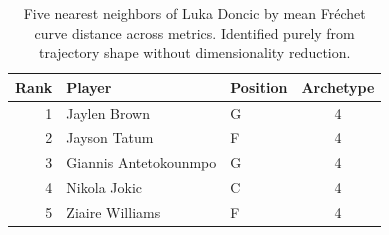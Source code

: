 \begin{table}[htbp]
  \centering\small
  \begin{tabular}{rllc}
    \toprule
    Rank & Player & Position & Archetype \\
    \midrule
    1 & Jaylen Brown & G & 4 \\
    2 & Jayson Tatum & F & 4 \\
    3 & Giannis Antetokounmpo & G & 4 \\
    4 & Nikola Jokic & C & 4 \\
    5 & Ziaire Williams & F & 4 \\
    \bottomrule
  \end{tabular}
  \caption{Five nearest neighbors of Luka Doncic by mean Fr\'{e}chet curve distance across metrics. Identified purely from trajectory shape without dimensionality reduction.}
  \label{tab:Luka_Doncic_frechet_curve_neighbors}
\end{table}

